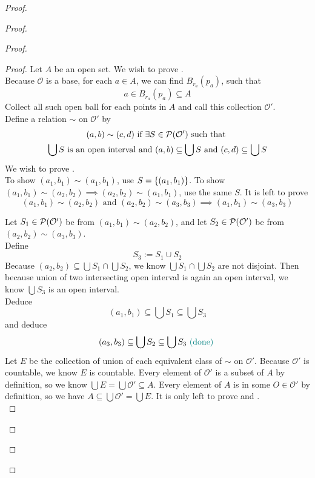 \documentclass{report}
\begin{document}
\begin{proof}
\begin{proof}
\begin{proof}
\begin{proof}
Let $A$ be an open set. We wish to prove .\\


Because $\mathcal{O}$ is a base, for each $a\in A$, we can find $B_{r_a}(p_a)$, such that
\begin{equation}
a\in B_{r_a}(p_a)\subseteq A
\end{equation}
Collect all such open ball for each points in $A$ and call this collection  $\mathcal{O}'$.\\

Define a relation $\sim$ on $\mathcal{O}'$ by 
\begin{gather}
  (a,b)\sim (c,d) \text{ if }\exists S\in \mathcal{P}(\mathcal{O}')\text{ such that }\\
  \bigcup S\text{ is an open interval and }(a,b)\subseteq\bigcup S\text{ and }(c,d)\subseteq \bigcup S
\end{gather}
We wish to prove .\\

To show $(a_1,b_1)\sim (a_1,b_1)$, use $S=\{ (a_1,b_1) \}$. To show $(a_1,b_1)\sim (a_2,b_2)\implies (a_2,b_2)\sim (a_1,b_1)$, use the same $S$. It is left to prove
\begin{equation}
  (a_1,b_1)\sim (a_2,b_2)\text{ and }(a_2,b_2)\sim (a_3,b_3)\implies (a_1,b_1)\sim (a_3,b_3)
\end{equation}

Let $S_1\in \mathcal{P}(\mathcal{O}')$ be from $(a_1,b_1)\sim (a_2,b_2)$, and let $S_2\in \mathcal{P}(\mathcal{O}')$ be from $(a_2,b_2)\sim (a_3,b_3)$.\\

Define 
\begin{equation}
S_3:=S_1\cup S_2 
\end{equation}
Because $(a_2,b_2)\subseteq \bigcup S_1\cap \bigcup S_2$, we know $\bigcup S_1\cap \bigcup S_2$ are not disjoint. Then because union of two intersecting open interval is again an open interval, we know $\bigcup S_3$ is an open interval.\\

Deduce
\begin{equation}
  (a_1,b_1)\subseteq \bigcup S_1\subseteq \bigcup S_3
\end{equation}
and deduce
\begin{equation}
  (a_3,b_3)\subseteq \bigcup S_2\subseteq \bigcup S_3\textcolor{teal}{\text{ (done) }}
\end{equation}
Let $E$ be the collection of union of each equivalent class of $\sim$ on $\mathcal{O}'$. Because $\mathcal{O}'$ is countable, we know $E$ is countable. Every element of $\mathcal{O}'$ is a subset of $A$ by definition, so we know  $\bigcup E=\bigcup \mathcal{O}'\subseteq A$. Every element of $A$ is in some  $O\in \mathcal{O}'$ by definition, so we have $A\subseteq \bigcup \mathcal{O}'=\bigcup E$. It is only left to prove  and .\\


\end{proof}
\end{proof}
\end{proof}
\end{proof}
\end{document}
